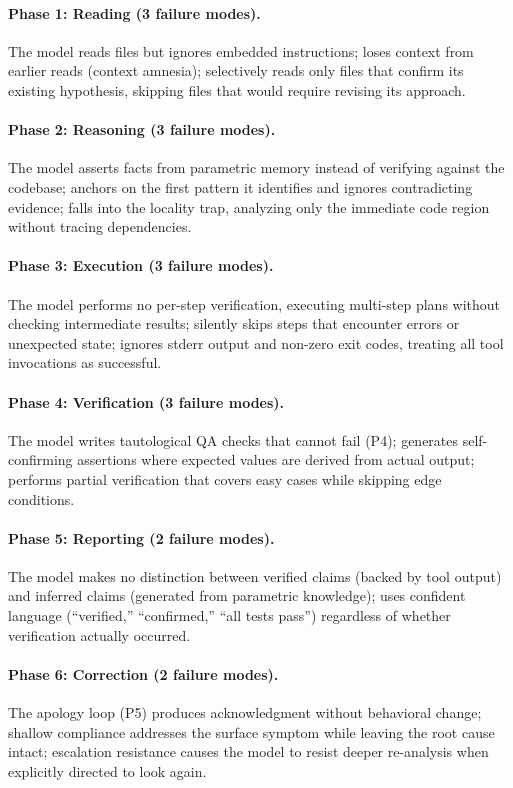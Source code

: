 \paragraph{Phase 1: Reading (3 failure modes).}
The model reads files but ignores embedded instructions; loses context from earlier reads (context amnesia); selectively reads only files that confirm its existing hypothesis, skipping files that would require revising its approach.

\paragraph{Phase 2: Reasoning (3 failure modes).}
The model asserts facts from parametric memory instead of verifying against the codebase; anchors on the first pattern it identifies and ignores contradicting evidence; falls into the locality trap, analyzing only the immediate code region without tracing dependencies.

\paragraph{Phase 3: Execution (3 failure modes).}
The model performs no per-step verification, executing multi-step plans without checking intermediate results; silently skips steps that encounter errors or unexpected state; ignores stderr output and non-zero exit codes, treating all tool invocations as successful.

\paragraph{Phase 4: Verification (3 failure modes).}
The model writes tautological QA checks that cannot fail (P4); generates self-confirming assertions where expected values are derived from actual output; performs partial verification that covers easy cases while skipping edge conditions.

\paragraph{Phase 5: Reporting (2 failure modes).}
The model makes no distinction between verified claims (backed by tool output) and inferred claims (generated from parametric knowledge); uses confident language (``verified,'' ``confirmed,'' ``all tests pass'') regardless of whether verification actually occurred.

\paragraph{Phase 6: Correction (2 failure modes).}
The apology loop (P5) produces acknowledgment without behavioral change; shallow compliance addresses the surface symptom while leaving the root cause intact; escalation resistance causes the model to resist deeper re-analysis when explicitly directed to look again.

